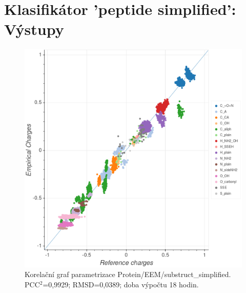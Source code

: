 \chapter{Klasifikátor 'peptide simplified': Výstupy}
\label{priloha_peptide}

\begin{figure}[h]
\begin{center}
\includegraphics[width=13cm]{pictures/graph_peptidesimpl_EEM.png}
\caption{Korelační graf parametrizace Protein/EEM/substruct\_simplified.  PCC$^2$=0,9929; RMSD=0,0389; doba výpočtu 18 hodin.}
\label{graph_peptidesimpl_EEM}
\end{center}
\end{figure}
\newpage

